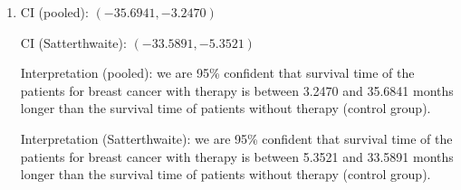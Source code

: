 \documentclass{article}
\begin{document}
\begin{enumerate}[leftmargin = 0 em, label = \arabic*., font = \bfseries]
\begin{enumerate}
\item

CI (pooled): $(-35.6941, -3.2470)$

CI (Satterthwaite): $(-33.5891, -5.3521)$

Interpretation (pooled): we are 95\% confident that survival time of the patients for breast cancer with therapy is between 3.2470 and 35.6841 months longer than the survival time of patients without therapy (control group).

Interpretation (Satterthwaite): we are 95\% confident that survival time of the patients for breast cancer with therapy is between 5.3521 and 33.5891 months longer than the survival time of patients without therapy (control group).
 	\end{enumerate}

\end{enumerate}
	
	
	
	
\end{document}
